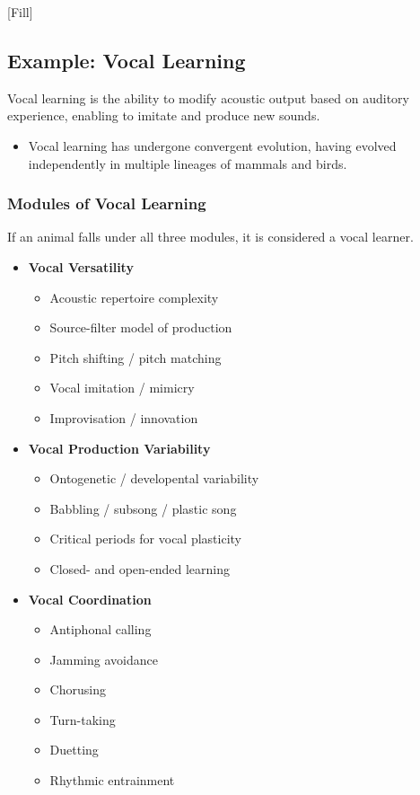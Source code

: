 \documentclass[10pt]{article}
\begin{document}
[Fill]

\subsection*{Example: Vocal Learning}
Vocal learning is the ability to modify acoustic output based on auditory experience, enabling to imitate and produce new sounds.
\begin{itemize}
	\item Vocal learning has undergone convergent evolution, having evolved independently in multiple lineages of mammals and birds.
\end{itemize}

\subsubsection*{Modules of Vocal Learning}
If an animal falls under all three modules, it is considered a vocal learner.
\begin{itemize}
	\item \textbf{Vocal Versatility}
	\begin{itemize}
	    \item Acoustic repertoire complexity
	    \item Source-filter model of production
	    \item Pitch shifting / pitch matching
	    \item Vocal imitation / mimicry
	    \item Improvisation / innovation
    \end{itemize}
	\item \textbf{Vocal Production Variability}
	\begin{itemize}
	    \item Ontogenetic / developental variability
	    \item Babbling / subsong / plastic song
	    \item Critical periods for vocal plasticity
	    \item Closed- and open-ended learning
    \end{itemize}
	\item \textbf{Vocal Coordination}
	\begin{itemize}
	    \item Antiphonal calling
	    \item Jamming avoidance
	    \item Chorusing
	    \item Turn-taking
	    \item Duetting
	    \item Rhythmic entrainment
    \end{itemize}
\end{itemize}
\end{document}
